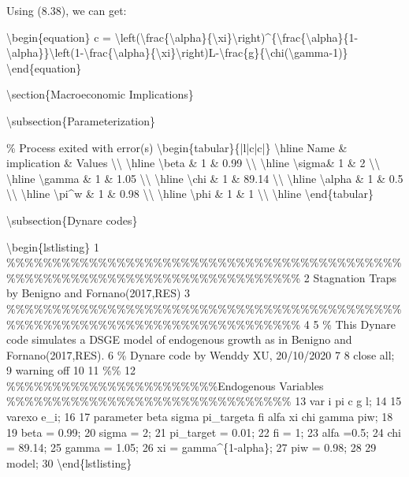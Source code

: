 \documentclass[10pt,math=newtx,citestyle=gb7714-2015,bibstyle=gb7714-2015]{elegantbook}
\begin{document}
	Using (8.38), we can get:
	
	\textbackslash{}begin\{equation\}
	c =  \textbackslash{}left(\textbackslash{}frac\{\textbackslash{}alpha\}\{\textbackslash{}xi\}\textbackslash{}right)\^{}\{\textbackslash{}frac\{\textbackslash{}alpha\}\{1-\textbackslash{}alpha\}\}\textbackslash{}left(1-\textbackslash{}frac\{\textbackslash{}alpha\}\{\textbackslash{}xi\}\textbackslash{}right)L-\textbackslash{}frac\{g\}\{\textbackslash{}chi(\textbackslash{}gamma-1)\}
	\textbackslash{}end\{equation\}
	
	\textbackslash{}section\{Macroeconomic Implications\}
	
	\textbackslash{}subsection\{Parameterization\}
	
	\% Process exited with error(s)
	\textbackslash{}begin\{tabular\}\{|l|c|c|\}
	\textbackslash{}hline
	Name \& implication \& Values \textbackslash{}\textbackslash{}
	\textbackslash{}hline
	\textbackslash{}beta \& 1 \& 0.99 \textbackslash{}\textbackslash{}
	\textbackslash{}hline
	\textbackslash{}sigma\& 1 \& 2 \textbackslash{}\textbackslash{}
	\textbackslash{}hline
	\textbackslash{}gamma \& 1 \& 1.05 \textbackslash{}\textbackslash{}
	\textbackslash{}hline
	\textbackslash{}chi \& 1 \& 89.14 \textbackslash{}\textbackslash{}
	\textbackslash{}hline
	\textbackslash{}alpha \& 1 \& 0.5 \textbackslash{}\textbackslash{}
	\textbackslash{}hline
	\textbackslash{}pi\^{}w \& 1 \& 0.98 \textbackslash{}\textbackslash{}
	\textbackslash{}hline
	\textbackslash{}phi \& 1 \& 1 \textbackslash{}\textbackslash{}
	\textbackslash{}hline
	\textbackslash{}end\{tabular\}
	
	\textbackslash{}subsection\{Dynare codes\}
	
	\textbackslash{}begin\{lstlisting\}
	1	\%\%\%\%\%\%\%\%\%\%\%\%\%\%\%\%\%\%\%\%\%\%\%\%\%\%\%\%\%\%\%\%\%\%\%\%\%\%\%\%\%\%\%\%\%\%\%\%\%\%\%\%\%\%\%\%\%\%\%\%\%\%\%\%\%\%\%\%\%\%\%\%\%\%\%
	2	Stagnation Traps by Benigno and Fornano(2017,RES)
	3	\%\%\%\%\%\%\%\%\%\%\%\%\%\%\%\%\%\%\%\%\%\%\%\%\%\%\%\%\%\%\%\%\%\%\%\%\%\%\%\%\%\%\%\%\%\%\%\%\%\%\%\%\%\%\%\%\%\%\%\%\%\%\%\%\%\%\%\%\%\%\%\%\%\%\%
	4	
	5	\% This Dynare code simulates a DSGE model of endogenous growth as in  Benigno and Fornano(2017,RES).
	6	\% Dynare code by Wenddy XU, 20/10/2020
	7	
	8	close all;
	9	warning off
	10	
	11	\%\%
	12	\%\%\%\%\%\%\%\%\%\%\%\%\%\%\%\%\%\%\%\%\%\%\%Endogenous Variables \%\%\%\%\%\%\%\%\%\%\%\%\%\%\%\%\%\%\%\%\%\%\%\%\%\%\%\%\%\%\%
	13	var i pi c g l;
	14
	15 varexo e\_i;
	16
	17 parameter beta sigma pi\_targeta fi alfa xi chi gamma piw;
	18
	19 beta = 0.99;
	20 sigma = 2;
	21 pi\_target = 0.01;
	22 fi = 1;
	23 alfa =0.5;
	24 chi = 89.14;
	25 gamma = 1.05;
	26 xi = gamma\^{}\{1-alpha\};
	27 piw = 0.98;
	28
	29 model;
	30  
	\textbackslash{}end\{lstlisting\}
	
\end{document}
